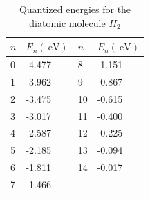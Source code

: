 \documentclass[11pt]{article}
\begin{document}
\begin{table}[H]
\centering
\caption{Quantized energies for the diatomic molecule $H_2$}
\label{tbl:energy}
\begin{tabular}{ll|ll}
$n$ & $E_n(\SI{}{\electronvolt})$  & $n$ & $E_n(\SI{}{\electronvolt})$  \\\hline
0   & -4.477 & 8   & -1.151 \\
1   & -3.962 & 9   & -0.867 \\
2   & -3.475 & 10  & -0.615 \\
3   & -3.017 & 11  & -0.400 \\
4   & -2.587 & 12  & -0.225 \\
5   & -2.185 & 13  & -0.094 \\
6   & -1.811 & 14  & -0.017 \\
7   & -1.466                      &     &       
\end{tabular}
\end{table}
\end{document}
